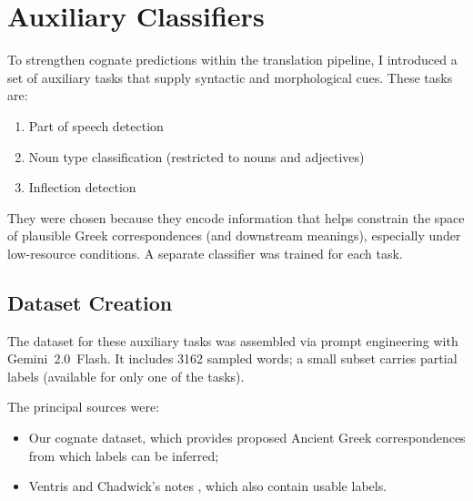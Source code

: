 \chapter{Auxiliary Classifiers} \label{chap:classifiers}
To strengthen cognate predictions within the translation pipeline, I introduced a set of auxiliary tasks that supply syntactic and morphological cues. These tasks are:
\begin{enumerate}
    \item Part of speech detection
    \item Noun type classification (restricted to nouns and adjectives)
    \item Inflection detection
\end{enumerate}
They were chosen because they encode information that helps constrain the space of plausible Greek correspondences (and downstream meanings), especially under low-resource conditions. A separate classifier was trained for each task.

\section{Dataset Creation}
The dataset for these auxiliary tasks was assembled via prompt engineering with Gemini~2.0~Flash. It includes 3162 sampled words; a small subset carries partial labels (available for only one of the tasks).

The principal sources were:
\begin{itemize}
    \item Our cognate dataset, which provides proposed Ancient Greek correspondences from which labels can be inferred;
    \item Ventris and Chadwick's notes \cite{chadwick-notes}, which also contain usable labels.
\end{itemize}

